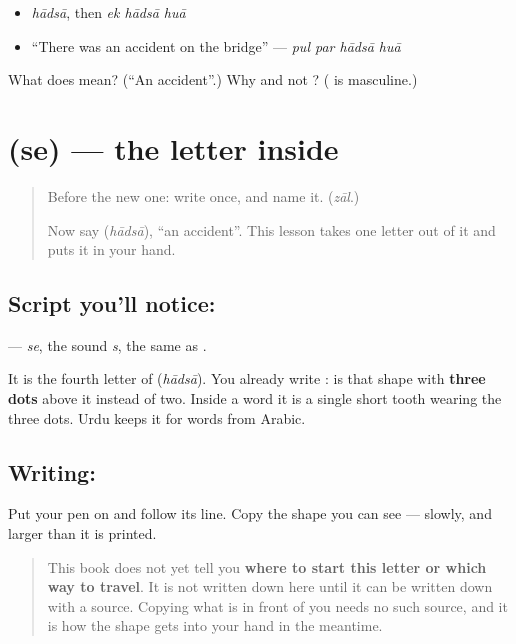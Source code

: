 \begin{itemize}
\raggedright
  \item \emph{hādsā}, then \emph{ek hādsā huā}
  \item \textquotedblleft{}There was an accident on the bridge\textquotedblright{} — \emph{pul par hādsā huā}
\end{itemize}

\begin{tcolorbox}[breakable,colback=teal!4,colframe=teal!35!black,title={Before you move on}]
What does \textbf{} mean? (\textquotedblleft{}An accident\textquotedblright{}.) Why \textbf{} and not \textbf{}? (\textbf{} is masculine.)
\end{tcolorbox}
\section[\texorpdfstring{\ur{ث} (se)}{ث (se)}]{ (se) — the letter inside }

\label{lesson:UR-W271-se}



\begin{quote}
Before the new one: write  once, and name it. (\emph{zāl}.)

Now say \textbf{} (\emph{hādsā}), \textquotedblleft{}an accident\textquotedblright{}. This lesson takes one letter out of it and puts it in your hand.
\end{quote}

\subsection*{Script you'll notice: }
\textbf{} — \emph{se}, the sound \emph{s}, the same as \textbf{}.

It is the fourth letter of \textbf{} (\emph{hādsā}). You already write \textbf{}: \textbf{} is that shape with \textbf{three dots} above it instead of two. Inside a word it is a single short tooth wearing the three dots. Urdu keeps it for words from Arabic.

\subsection*{Writing: }
Put your pen on  and follow its line. Copy the shape you can see — slowly, and larger than it is printed.

\begin{quote}
This book does not yet tell you \textbf{where to start this letter or which way to travel}. It is not written down here until it can be written down with a source. Copying what is in front of you needs no such source, and it is how the shape gets into your hand in the meantime.
\end{quote}

